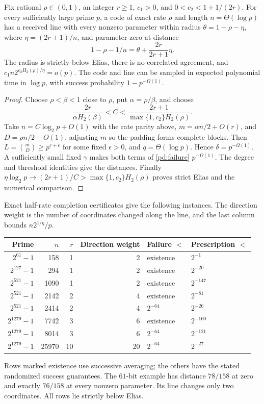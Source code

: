 \begin{theorem}
\label{pd:punctured-line}
Fix rational $\rho\in(0,1)$, an integer $r\ge1$, $c_1>0$, and
$0<c_2<1+1/(2r)$. For every sufficiently large prime $p$, a code of
exact rate $\rho$ and length $n=\Theta(\log p)$ has a received line
with every nonzero parameter within radius $\theta=1-\rho-\eta$,
where $\eta=(2r+1)/n$, and parameter zero at distance
\[
 1-\rho-1/n=\theta+\frac{2r}{2r+1}\eta.
\]
The radius is strictly below Elias, there is no correlated agreement,
and $c_1n2^{c_2H_2(\rho)/\eta}=o(p)$. The code and line can be
sampled in expected polynomial time in $\log p$, with success
probability $1-p^{-\Omega(1)}$.
\end{theorem}
\begin{proof}
Choose $\rho<\beta<1$ close to $\rho$, put $\alpha=\rho/\beta$,
and choose
\[
 \frac{2r}{\alpha H_2(\beta)}<C<
 \frac{2r+1}{\max\{1,c_2\}H_2(\rho)}.
\]
Take $n=C\log_2p+O(1)$ with the rate parity above,
$m=\alpha n/2+O(r)$, and $D=\rho n/2+O(1)$, adjusting $m$ so the
padding forms complete blocks. Then
$L=\binom mD\ge p^{r+\epsilon}$ for some fixed $\epsilon>0$,
and $q=\Theta(\log p)$. Hence $\delta=p^{-\Omega(1)}$.
A sufficiently small fixed $\gamma$ makes both terms of
\eqref{pd:failure} $p^{-\Omega(1)}$. The degree and threshold
identities give the distances. Finally
$\eta\log_2p\to(2r+1)/C>\max\{1,c_2\}H_2(\rho)$ proves strict
Elias and the numerical comparison.
\end{proof}



Exact half-rate completion certificates give the following instances.
The direction weight is the number of coordinates changed along the
line, and the last column bounds $n2^{1/\eta}/p$.
\begin{center}
\begin{tabular}{@{}rrrrll@{}}
\toprule
Prime & $n$ & $r$ & Direction weight & Failure $<$ & Prescription $<$\\
\midrule
$2^{61}-1$&158&1&2&existence&$2^{-1}$\\
$2^{127}-1$&294&1&2&existence&$2^{-20}$\\
$2^{521}-1$&1090&1&2&existence&$2^{-147}$\\
$2^{521}-1$&2142&2&4&existence&$2^{-81}$\\
$2^{521}-1$&2414&2&4&$2^{-64}$&$2^{-26}$\\
$2^{1279}-1$&7742&3&6&existence&$2^{-160}$\\
$2^{1279}-1$&8014&3&6&$2^{-64}$&$2^{-121}$\\
$2^{1279}-1$&25970&10&20&$2^{-64}$&$2^{-27}$\\
\bottomrule
\end{tabular}
\end{center}
Rows marked existence use successive averaging; the others have the
stated randomized success guarantees. The $61$-bit example has distance
$78/158$ at zero and exactly $76/158$ at every nonzero parameter.
Its line changes only two coordinates. All rows lie strictly below Elias.

